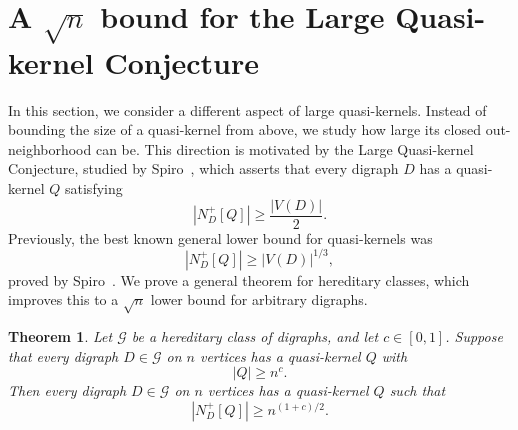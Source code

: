 \documentclass[11pt,a4paper]{article}
\newtheorem{theorem}{Theorem}[section]
\begin{document}
\section{A \texorpdfstring{$\sqrt n$}{sqrt(n)} bound for the Large Quasi-kernel Conjecture}
In this section, we consider a different aspect of large quasi-kernels.
Instead of bounding the size of a quasi-kernel from above, we study how large
its closed out-neighborhood can be. This direction is motivated by the
Large Quasi-kernel Conjecture, studied by Spiro~\cite{Spiro}, which asserts
that every digraph \(D\) has a quasi-kernel \(Q\) satisfying
\[
|N_D^+[Q]|\ge \frac{|V(D)|}{2}.
\]
Previously, the best known general lower bound for quasi-kernels was
\[
|N_D^+[Q]|\ge |V(D)|^{1/3},
\]
proved by Spiro~\cite[Theorem 2.8]{Spiro}. We prove a general
theorem for hereditary classes, which improves this to a \(\sqrt n\) lower
bound for arbitrary digraphs.

\begin{theorem}\label{thm:amplification}
Let \(\mathcal G\) be a hereditary class of digraphs, and let \(c\in[0,1]\).
Suppose that every digraph \(D\in\mathcal G\) on \(n\) vertices has a
quasi-kernel \(Q\) with
\[
    |Q|\ge n^c .
\]
Then every digraph \(D\in\mathcal G\) on \(n\) vertices has a quasi-kernel \(Q\)
such that
\[
    |N_D^+[Q]|\ge n^{(1+c)/2}.
\]
\end{theorem}
\end{document}
